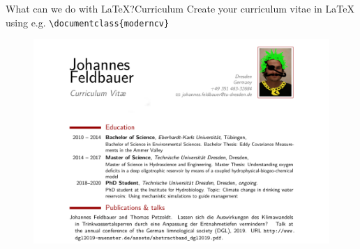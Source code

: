 \documentclass[presentation, aspectratio=1610]{beamer}
\begin{document}
\begin{frame}{What can we do with \LaTeX{}?}{Curriculum}
  Create your curriculum vitae in \LaTeX{} using e.g. \texttt{\textbackslash{}documentclass\{moderncv\}}
  \begin{figure}
    \centering
    \includegraphics[width=\textheight]{CV_example}
  \end{figure}
\end{frame}
\end{document}
